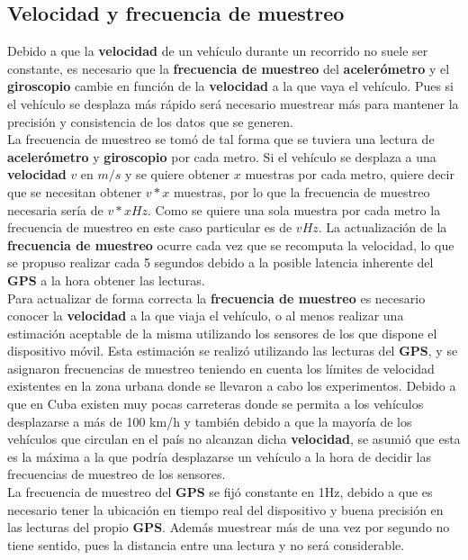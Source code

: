 	\subsection{Velocidad y frecuencia de muestreo}
		Debido a que la \textbf{velocidad} de un vehículo durante un recorrido no suele ser constante, es necesario que la \textbf
		{frecuencia de muestreo} del \textbf{acelerómetro} y el \textbf{giroscopio} cambie en función de la \textbf{velocidad}
		a la que vaya el vehículo. Pues si el vehículo se desplaza más rápido será necesario muestrear más para mantener la
		precisión y consistencia de los datos que se generen.\\
		\indent La frecuencia de muestreo se tomó de tal forma que se tuviera una lectura de \textbf{acelerómetro} y \textbf
		{giroscopio} por cada metro. Si el vehículo se desplaza a una \textbf{velocidad} $v$ en $m/s$ y se quiere obtener
		$x$ muestras por cada metro, quiere decir que se necesitan obtener $v * x$ muestras, por lo que la frecuencia de muestreo
		necesaria sería de $v * x Hz$. Como se quiere una sola muestra por cada metro la frecuencia de muestreo
		en este caso particular es de $v Hz$. La actualización de la \textbf{frecuencia de muestreo} ocurre cada vez que se recomputa
		la velocidad, lo que se propuso realizar cada 5 segundos debido a la posible latencia inherente del \textbf{GPS} a la hora
		obtener las lecturas.\\
		\indent Para actualizar de forma correcta la \textbf{frecuencia de muestreo} es necesario conocer la \textbf{velocidad}
		a la que viaja el vehículo, o al menos realizar una estimación aceptable de la misma utilizando los sensores de
		los que dispone el dispositivo móvil. Esta estimación se realizó utilizando las lecturas del \textbf{GPS}, y se 
		asignaron frecuencias de muestreo teniendo en cuenta los límites de velocidad existentes en la zona urbana donde 
		se llevaron a cabo los experimentos. Debido a que en Cuba existen muy pocas carreteras donde se permita a
		los vehículos desplazarse a más de 100 km/h y también debido a que la mayoría de los vehículos que circulan en
		el país no alcanzan dicha \textbf{velocidad}, se asumió que esta es la máxima a la que podría desplazarse un
		vehículo a la hora de decidir las frecuencias de muestreo de los sensores.\\
		\indent La frecuencia de muestreo del \textbf{GPS} se fijó constante en 1Hz, debido a que es necesario tener 
		la ubicación en tiempo real del dispositivo y buena precisión en las lecturas del propio \textbf{GPS}. Además 
		muestrear más de una vez por segundo no tiene sentido, pues la distancia entre una lectura y no será considerable.\\

